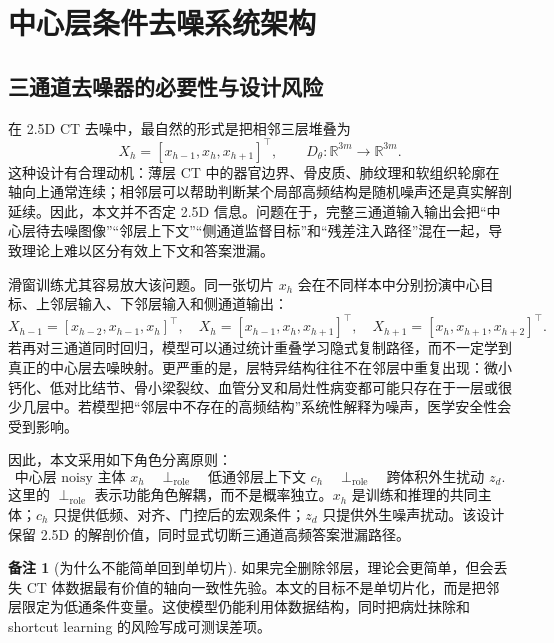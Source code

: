 \documentclass[11pt,a4paper,UTF8,fontset=fandol]{ctexart}
\theoremstyle{definition}
\newtheorem{remark}[theorem]{备注}
\begin{document}
\section{中心层条件去噪系统架构}

\subsection{三通道去噪器的必要性与设计风险}

在 2.5D CT 去噪中，最自然的形式是把相邻三层堆叠为
\begin{equation}
    X_h=[x_{h-1},x_h,x_{h+1}]^\top,
    \qquad
    D_\theta:\mathbb R^{3m}\to\mathbb R^{3m}.
\end{equation}
这种设计有合理动机：薄层 CT 中的器官边界、骨皮质、肺纹理和软组织轮廓在轴向上通常连续；相邻层可以帮助判断某个局部高频结构是随机噪声还是真实解剖延续。因此，本文并不否定 2.5D 信息。问题在于，完整三通道输入输出会把“中心层待去噪图像”“邻层上下文”“侧通道监督目标”和“残差注入路径”混在一起，导致理论上难以区分有效上下文和答案泄漏。

滑窗训练尤其容易放大该问题。同一张切片 $x_h$ 会在不同样本中分别扮演中心目标、上邻层输入、下邻层输入和侧通道输出：
\begin{equation}
    X_{h-1}=[x_{h-2},x_{h-1},x_h]^\top,
    \quad
    X_h=[x_{h-1},x_h,x_{h+1}]^\top,
    \quad
    X_{h+1}=[x_h,x_{h+1},x_{h+2}]^\top .
\end{equation}
若再对三通道同时回归，模型可以通过统计重叠学习隐式复制路径，而不一定学到真正的中心层去噪映射。更严重的是，层特异结构往往不在邻层中重复出现：微小钙化、低对比结节、骨小梁裂纹、血管分叉和局灶性病变都可能只存在于一层或很少几层中。若模型把“邻层中不存在的高频结构”系统性解释为噪声，医学安全性会受到影响。

因此，本文采用如下角色分离原则：
\begin{equation}
\label{eq:role-separation-coreA}
    \text{中心层 noisy 主体 }x_h
    \quad\perp_{\mathrm{role}}\quad
    \text{低通邻层上下文 }c_h
    \quad\perp_{\mathrm{role}}\quad
    \text{跨体积外生扰动 }z_d.
\end{equation}
这里的 $\perp_{\mathrm{role}}$ 表示功能角色解耦，而不是概率独立。$x_h$ 是训练和推理的共同主体；$c_h$ 只提供低频、对齐、门控后的宏观条件；$z_d$ 只提供外生噪声扰动。该设计保留 2.5D 的解剖价值，同时显式切断三通道高频答案泄漏路径。

\begin{remark}[为什么不能简单回到单切片]
如果完全删除邻层，理论会更简单，但会丢失 CT 体数据最有价值的轴向一致性先验。本文的目标不是单切片化，而是把邻层限定为低通条件变量。这使模型仍能利用体数据结构，同时把病灶抹除和 shortcut learning 的风险写成可测误差项。
\end{remark}
\end{document}
